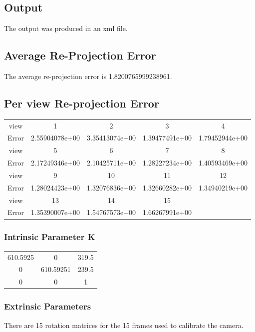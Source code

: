 \documentclass[12pt]{article}
\begin{document}
\subsection{Output}
The output was produced in an xml file.

\subsection{Average Re-Projection Error}
The average re-projection error is 1.8200765999238961.
\subsection{Per view Re-projection Error}
\begin{tabular}{|c|c|c|c|c|}
\hline
view & 1 & 2 & 3 & 4 \\
Error & 2.55904078e+00 & 3.35413074e+00 & 1.39477491e+00 & 1.79452944e+00 \\
\hline \hline
view & 5 & 6 & 7 & 8 \\
Error & 2.17249346e+00 & 2.10425711e+00 & 1.28227234e+00 & 1.40593469e+00 \\
\hline \hline
view & 9 & 10 & 11 & 12 \\
Error &  1.28024423e+00 & 1.32076836e+00 & 1.32660282e+00 &  1.34940219e+00 \\
\hline \hline
view & 13 & 14 & 15 &  \\
 Error &  1.35390007e+00 & 1.54767573e+00 & 1.66267991e+00 &  \\
 \hline
\end{tabular}
 
    
   


\subsubsection{Intrinsic Parameter K}
\begin{tabular}{|c|c|c|}
\hline
610.5925  & 0 & 319.5 \\
0 &  610.59251 & 239.5 \\
0 & 0 & 1\\
\hline
\end{tabular}

\subsubsection{Extrinsic Parameters}
There are 15 rotation matrices for the 15 frames used to calibrate the camera.
\end{document}
